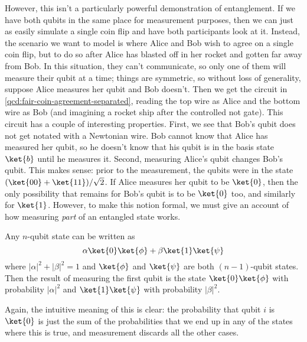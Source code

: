 However, this isn't a particularly powerful demonstration of entanglement.  If
we have both qubits in the same place for measurement purposes, then we can just
as easily simulate a single coin flip and have both participants look at it.
Instead, the scenario we want to model is where Alice and Bob wish to agree on a
single coin flip, but to do so after Alice has blasted off in her rocket and
gotten far away from Bob.  In this situation, they can't communicate, so only
one of them will measure their qubit at a time; things are symmetric, so without
loss of generality, suppose Alice measures her qubit and Bob doesn't.  Then we
get the circuit in \cref{qcd:fair-coin-agreement-separated}, reading the top
wire as Alice and the bottom wire as Bob (and imagining a rocket ship after the
controlled not gate).  This circuit has a couple of interesting properties.
First, we see that Bob's qubit does not get notated with a Newtonian wire.  Bob
cannot know that Alice has measured her qubit, so he doesn't know that his qubit
is in the basis state $\ket{b}$ until he measures it.  Second, measuring Alice's
qubit changes Bob's qubit.  This makes sense: prior to the measurement, the
qubits were in the state $(\ket{00} + \ket{11})/\sqrt{2}$.  If Alice measures
her qubit to be $\ket{0}$, then the only possibility that remains for Bob's
qubit is to be $\ket{0}$ too, and similarly for $\ket{1}$.  However, to make
this notion formal, we must give an account of how measuring \emph{part} of an
entangled state works.

\begin{definition}\label{def:partial-measurement}
Any $n$-qubit state can be written as
\[
    \alpha \ket{0} \ket{\phi}
    + \beta \ket{1} \ket{\psi}
\]
where $|\alpha|^2 + |\beta|^2 = 1$ and $\ket{\phi}$ and $\ket{\psi}$ are both $(n-1)$-qubit states.
Then the result of measuring the first qubit is the state
$\ket{0} \ket{\phi}$ with probability $|\alpha|^2$ and
$\ket{1} \ket{\psi}$ with probability $|\beta|^2$.
\end{definition}

Again, the intuitive meaning of this is clear: the probability that qubit $i$ is
$\ket{0}$ is just the sum of the probabilities that we end up in any of the
states where this is true, and measurement discards all the other cases.  
